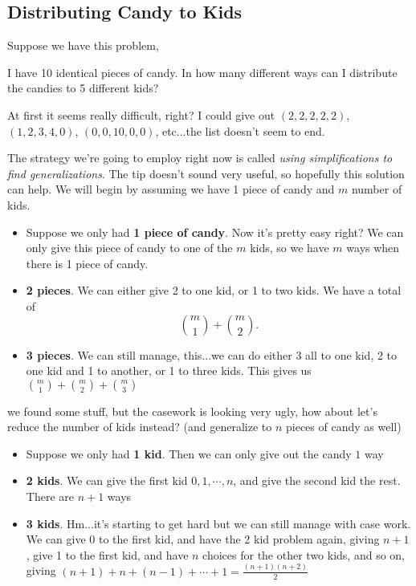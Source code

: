 \subsection{Distributing Candy to Kids}

Suppose we have this problem, 

\begin{problem}
I have 10 identical pieces of candy. In how many different ways can I distribute the candies to 5 different kids?
\end{problem}

At first it seems really difficult, right? I could give out $(2, 2, 2, 2, 2)$, $(1, 2, 3, 4, 0)$, $(0, 0, 10, 0, 0)$, etc...the list doesn't seem to end. 

The strategy we're going to employ right now is called \textit{using simplifications to find generalizations}. The tip doesn't sound very useful, so hopefully this solution can help. We will begin by assuming we have 1 piece of candy and $m$ number of kids.

\begin{itemize}
    \item Suppose we only had \textbf{1 piece of candy}. Now it's pretty easy right? We can only give this piece of candy to one of the $m$ kids, so we have $\boxed{m}$ ways when there is 1 piece of candy. 
    \item \textbf{2 pieces}. We can either give 2 to one kid, or 1 to two kids. We have a total of $$\boxed{\binom{m}{1}+\binom{m}{2}}.$$
    \item \textbf{3 pieces}. We can still manage, this...we can do either 3 all to one kid, 2 to one kid and 1 to another, or 1 to three kids. This gives us $\boxed{\binom{m}{1}+\binom{m}{2}+\binom{m}{3}}$
\end{itemize}

we found some stuff, but the casework is looking very ugly, how about let's reduce the number of kids instead? (and generalize to $n$ pieces of candy as well)

\begin{itemize}
    \item Suppose we only had \textbf{1 kid}. Then we can only give out the candy $\boxed{1}$ way
    \item \textbf{2 kids}. We can give the first kid $0, 1, \cdots, n$, and give the second kid the rest. There are $\boxed{n+1}$ ways
    \item \textbf{3 kids}. Hm...it's starting to get hard but we can still manage with case work. We can give 0 to the first kid, and have the 2 kid problem again, giving $n+1$, give 1 to the first kid, and have $n$ choices for the other two kids, and so on, giving $(n+1)+n+(n-1)+\cdots+1 = \boxed{\frac{(n+1)(n+2)}{2}}$ 
\end{itemize}

